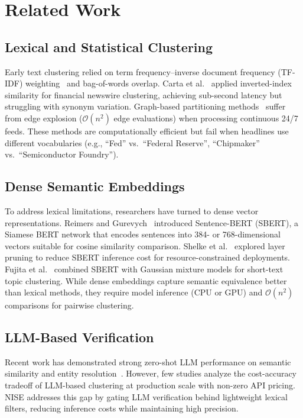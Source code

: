 \documentclass[conference]{IEEEtran}
\begin{document}
\section{Related Work}

\subsection{Lexical and Statistical Clustering}
Early text clustering relied on term frequency--inverse document frequency (TF-IDF) weighting~\cite{salton1988} and bag-of-words overlap.
Carta et al.~\cite{carta2022} applied inverted-index similarity for financial newswire clustering, achieving sub-second latency but struggling with synonym variation.
Graph-based partitioning methods~\cite{aggarwal2012} suffer from edge explosion ($\mathcal{O}(n^2)$ edge evaluations) when processing continuous 24/7 feeds.
These methods are computationally efficient but fail when headlines use different vocabularies (e.g., ``Fed'' vs.\ ``Federal Reserve'', ``Chipmaker'' vs.\ ``Semiconductor Foundry'').

\subsection{Dense Semantic Embeddings}
To address lexical limitations, researchers have turned to dense vector representations.
Reimers and Gurevych~\cite{reimers2019sentence} introduced Sentence-BERT (SBERT), a Siamese BERT network that encodes sentences into 384- or 768-dimensional vectors suitable for cosine similarity comparison.
Shelke et al.~\cite{shelke2022} explored layer pruning to reduce SBERT inference cost for resource-constrained deployments.
Fujita et al.~\cite{fujita2023} combined SBERT with Gaussian mixture models for short-text topic clustering.
While dense embeddings capture semantic equivalence better than lexical methods, they require model inference (CPU or GPU) and $\mathcal{O}(n^2)$ comparisons for pairwise clustering.

\subsection{LLM-Based Verification}
Recent work has demonstrated strong zero-shot LLM performance on semantic similarity and entity resolution~\cite{zhao2023,jin2023}.
However, few studies analyze the cost-accuracy tradeoff of LLM-based clustering at production scale with non-zero API pricing.
NISE addresses this gap by gating LLM verification behind lightweight lexical filters, reducing inference costs while maintaining high precision.
\end{document}
